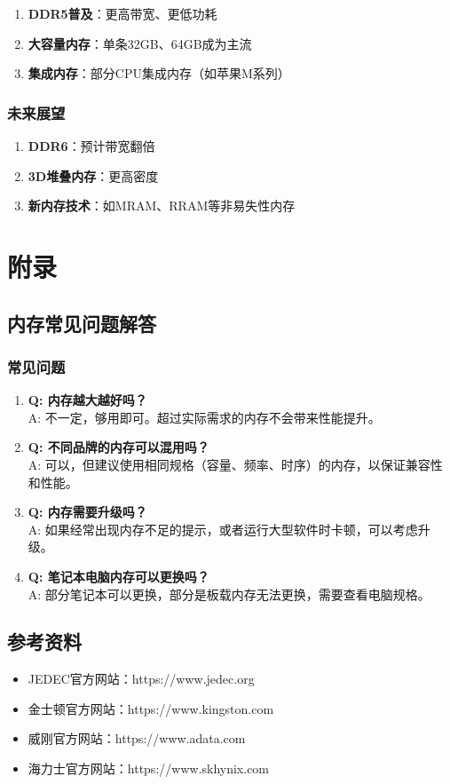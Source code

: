 \documentclass[12pt,UTF8]{ctexbook}
\begin{document}
\begin{enumerate}
    \item \textbf{DDR5普及}：更高带宽、更低功耗
    \item \textbf{大容量内存}：单条32GB、64GB成为主流
    \item \textbf{集成内存}：部分CPU集成内存（如苹果M系列）
\end{enumerate}

\section{未来展望}

\begin{enumerate}
    \item \textbf{DDR6}：预计带宽翻倍
    \item \textbf{3D堆叠内存}：更高密度
    \item \textbf{新内存技术}：如MRAM、RRAM等非易失性内存
\end{enumerate}

\part{附录}

\chapter{内存常见问题解答}

\section{常见问题}

\begin{enumerate}
    \item \textbf{Q: 内存越大越好吗？}
    \\A: 不一定，够用即可。超过实际需求的内存不会带来性能提升。
    
    \item \textbf{Q: 不同品牌的内存可以混用吗？}
    \\A: 可以，但建议使用相同规格（容量、频率、时序）的内存，以保证兼容性和性能。
    
    \item \textbf{Q: 内存需要升级吗？}
    \\A: 如果经常出现内存不足的提示，或者运行大型软件时卡顿，可以考虑升级。
    
    \item \textbf{Q: 笔记本电脑内存可以更换吗？}
    \\A: 部分笔记本可以更换，部分是板载内存无法更换，需要查看电脑规格。
\end{enumerate}

\chapter{参考资料}

\begin{itemize}[leftmargin=2em]
    \item JEDEC官方网站：https://www.jedec.org
    \item 金士顿官方网站：https://www.kingston.com
    \item 威刚官方网站：https://www.adata.com
    \item 海力士官方网站：https://www.skhynix.com
\end{itemize}

\backmatter
\end{document}
